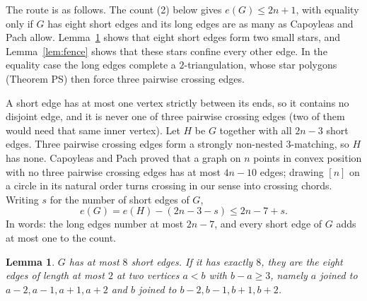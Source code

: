 \documentclass[11pt]{amsart}
\newtheorem{lemma}[theorem]{Lemma}
\theoremstyle{definition}\newtheorem{problem}{Problem}
\theoremstyle{remark}\newtheorem*{remark}{Remark}
\begin{document}
The route is as follows. The count (2) below gives $e(G)\le2n+1$, with equality only if $G$ has eight short edges and
its long edges are as many as Capoyleas and Pach allow. Lemma~\ref{lem:short} shows that eight short edges form two
small stars, and Lemma~\ref{lem:fence} shows that these stars confine every other edge. In the equality case the long
edges complete a $2$-triangulation, whose star polygons (Theorem PS) then force three pairwise crossing edges.

A short edge has at most one vertex strictly between its ends, so it contains no disjoint edge, and it is never one of
three pairwise crossing edges (two of them would need that same inner vertex). Let $H$ be $G$ together
with all $2n-3$ short edges. Three pairwise crossing edges form a strongly non-nested $3$-matching, so $H$ has none.
Capoyleas and Pach \cite{CP} proved that a graph on $n$ points in convex position with no three pairwise crossing
edges has at most $4n-10$ edges; drawing $[n]$ on a circle in its natural order turns crossing in our sense into
crossing chords. Writing $s$ for the number of short edges of $G$,
\[
e(G)=e(H)-(2n-3-s)\le 2n-7+s. \tag{2}
\]
In words: the long edges number at most $2n-7$, and every short edge of $G$ adds at most one to the count.

\begin{lemma}\label{lem:short}
$G$ has at most $8$ short edges. If it has exactly $8$, they are the eight edges of length at most $2$ at two vertices
$a<b$ with $b-a\ge3$, namely $a$ joined to $a-2,a-1,a+1,a+2$ and $b$ joined to $b-2,b-1,b+1,b+2$.
\end{lemma}
\end{document}
